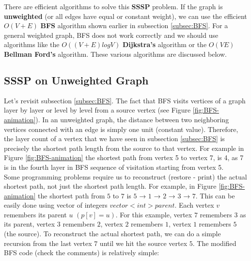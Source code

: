 \hspace{7mm}There are efficient algorithms to solve this \textbf{SSSP} problem. If the graph is \textbf{unweighted} (or all edges have equal or constant weight), we can use the efficient \textbf{$O(V + E)$} \textbf{BFS} algorithm shown earlier in subsection \ref{subsec:BFS}. For a general weighted graph, BFS does not work correctly and we should use algorithms like the {$O( (V + E) log V )$} \textbf{Dijkstra’s} algorithm or the \textbf{$O(V E)$} \textbf{Bellman Ford’s} algorithm. These various algorithms are discussed below.

\subsection{SSSP on Unweighted Graph}\label{subsec:SSSP on Unweighted Graph}
\hspace{7mm}Let’s revisit subsection \ref{subsec:BFS}. The fact that BFS visits vertices of a graph layer by layer or level by level from a source vertex (see Figure \ref{fig:BFS-animation}). In an unweighted graph, the distance between two neighboring vertices connected with an edge is simply one unit (constant value). Therefore, the layer count of a vertex that we have seen in subsection \ref{subsec:BFS} is precisely the shortest path length from the source to that vertex. For example in Figure \ref{fig:BFS-animation} the shortest path from vertex 5 to vertex 7, is 4, as 7 is in the fourth layer in BFS sequence of visitation starting from vertex 5.\\

\indent \hspace{7mm}Some programming problems require us to reconstruct (restore - print) the actual shortest path, not just the shortest path length. For example, in Figure \ref{fig:BFS-animation} the shortest path from $5$ to $7$ is $5$ → $1$ → $2$ → $3$ → $7$. This can be easily done using vector of integers $vector<int> parent$. Each vertex $v$ remembers its parent $u$ $(p[v] = u)$.  For this example, vertex $7$ remembers $3$ as its parent, vertex $3$ remembers $2$, vertex $2$ remembers $1$, vertex $1$ remembers $5$ (the source). To reconstruct the actual shortest path, we can do a simple recursion from the last vertex $7$ until we hit the source vertex $5$. The modified BFS code (check the comments) is relatively simple:
\\

